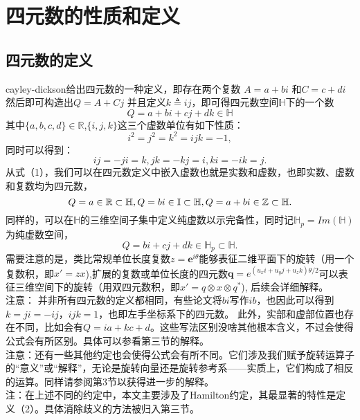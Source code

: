 \documentclass{article}
\begin{document}
\section{四元数的性质和定义}
\subsection{四元数的定义}
cayley-dickson给出四元数的一种定义，即存在两个复数
$A = a + bi $ 和$C = c+di$然后即可构造出$Q=A+Cj$ 并且定义$k \triangleq ij$，即可得四元数空间$\mathbb{H}$下的一个数
$$ 
Q = a+bi+cj+dk\in \mathbb{H} 
$$
其中$\{a,b,c,d\}\in \mathbb{R}$,$\{i,j,k\}$这三个虚数单位有如下性质：
$$ i^2=j^2=k^2=ijk=-1, 
$$同时可以得到：
$$ ij=-ji=k, jk=-kj=i, ki=-ik=j. 
$$从式（1），我们可以在四元数定义中嵌入虚数也就是实数和虚数，也即实数、虚数和复数均为四元数，
$$ 
Q =a \in \mathbb{R} \subset \mathbb{H},
\\Q =bi \in \mathbb{I} \subset \mathbb{H},
\\Q =a+bi \in \mathbb{Z} \subset \mathbb{H}.
$$同样的，可以在$\mathbb{H}$的三维空间子集中定义纯虚数以示完备性，同时记$\mathbb{H}_p = Im(\mathbb{H})$为纯虚数空间，
$$
Q = bi+cj+dk \in \mathbb{H}_p \subset\mathbb{H}. 
$$需要注意的是，类比常规单位长度复数$z=\textbf{e}^{i\theta}$能够表征二维平面下的旋转（用一个复数积，即$x{'}=zx$),扩展的复数或单位长度的四元数$\textbf{q}=e^{(u_xi+u_yj+u_zk)\theta/2}$可以表征三维空间下的旋转（用双四元数积，即$x{'}=q\otimes{x}\otimes{q}^{*}$),
后续会详细解释。
\\$\textbf{注意：}$ 并非所有四元数的定义都相同，有些论文将$bi$写作$ib$，也因此可以得到$k=ji=-ij，ijk=1$，也即左手坐标系下的四元数。
此外，实部和虚部位置也存在不同，比如会有$Q=ia+kc+d$。这些写法区别没啥其他根本含义，不过会使得公式会有所区别。具体可以参看第三节的解释。
\\$\textbf{注意：}$还有一些其他约定也会使得公式会有所不同。它们涉及我们赋予旋转运算子的“意义”或“解释”，无论是旋转向量还是旋转参考系——实质上，它们构成了相反的运算。同样请参阅第3节以获得进一步的解释。
\\$\textbf{注：}$在上述不同的约定中，本文主要涉及了Hamilton约定，其最显著的特性是定义（2）。具体消除歧义的方法被归入第三节。
\end{document}
